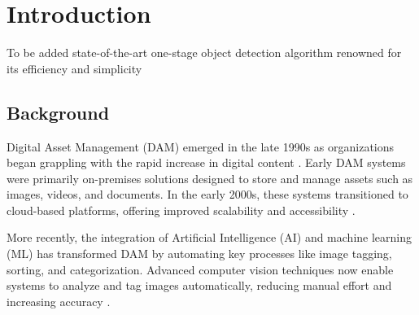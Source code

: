\documentclass[a4paper,10pt,twocolumn]{article}
\numberwithin{figure}{section}
\numberwithin{table}{section}
\begin{document}

\twocolumn
\flushbottom %


\sloppy        %



\section{Introduction}

To be added 
state-of-the-art one-stage object detection algorithm 
renowned for its efficiency and simplicity

\subsection{Background}
Digital Asset Management (DAM) emerged in the late 1990s as organizations began grappling 
with the rapid increase in digital content \citep{krogh2009}. Early DAM systems were primarily on-premises 
solutions designed to store and manage assets such as images, videos, and documents. 
In the early 2000s, these systems transitioned to cloud-based platforms, offering 
improved scalability and accessibility \citep{mccain2021}.

More recently, the integration of Artificial Intelligence (AI) and machine learning (ML) has transformed 
DAM by automating key processes like image tagging, sorting, and categorization. Advanced computer 
vision techniques now enable systems to analyze and tag images automatically, 
reducing manual effort and increasing accuracy \citep{MINGfANG}.

\end{document}
